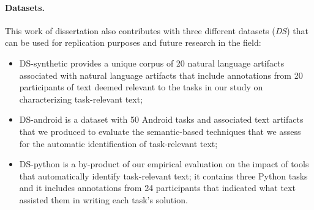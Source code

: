 







    



\paragraph{\textbf{Datasets.}} This work of dissertation also contributes with three different datasets ({\small \textit{DS}}) that can be used for replication purposes and future research in the field:
    
\begin{itemize}
    \item \acs{DS-synthetic} provides a unique corpus of 20 natural language artifacts associated
    with natural language artifacts that include annotations from 20 participants of text deemed relevant to 
    the tasks in our study on characterizing task-relevant text;
    
    \item \acs{DS-android} is a dataset with 50 Android tasks and associated text artifacts 
    that we produced to evaluate the semantic-based techniques that we assess for the automatic identification of task-relevant text;

    \item \acs{DS-python} is a by-product of our empirical evaluation on the impact of tools that automatically identify task-relevant text;
    it contains three Python tasks and it includes annotations from 24 participants that indicated what text assisted them in writing each task's solution.
\end{itemize}
